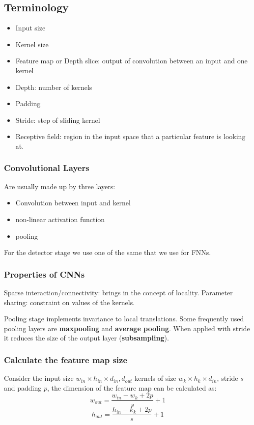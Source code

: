 \subsection{Terminology}
\begin{itemize}
    \item Input size
    \item Kernel size
    \item Feature map or Depth slice: output of convolution between an input and one kernel
    \item Depth: number of kernels
    \item Padding
    \item Stride: step of sliding kernel
    \item Receptive field: region in the input space that a particular feature is looking at.
\end{itemize}

\subsubsection{Convolutional Layers}
Are usually made up by three layers:
\begin{itemize}
    \item Convolution between input and kernel
    \item non-linear activation function
    \item pooling
\end{itemize}

For the detector stage we use one of the same that we use for FNNs.

\subsubsection{Properties of CNNs}
Sparse interaction/connectivity: brings in the concept of locality.
Parameter sharing: constraint on values of the kernels.

Pooling stage implements invariance to local translations. Some frequently used pooling layers are \textbf{maxpooling} and \textbf{average pooling}. When applied with stride it reduces the size of the output layer (\textbf{subsampling}).

\subsubsection{Calculate the feature map size}
Consider the input size $w_{in} \times h_{in} \times d_{in}, d_{out}$ kernels of size $w_{k} \times h_{k} \times d_{in}$, stride $s$ and padding $p$, the dimension of the feature map can be calculated as:
\begin{equation}
    w_{out} = \frac{w_{in} - w_{k} + 2p}{s} + 1
\end{equation}
\begin{equation}
    h_{out} = \frac{h_{in} - k_{k} + 2p}{s} + 1
\end{equation}

